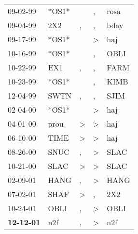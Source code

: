 \begin{supertabular}{p{0.07\textwidth}p{0.06\textwidth}p{0.02\textwidth}p{0.02\textwidth}p{0.06\textwidth}}
          09-02-99\textsuperscript{} &                   *OS1* &               &             , &  rosa\textsuperscript{} \\
          09-04-99\textsuperscript{} &   2X2\textsuperscript{} &             , &             , &  bday\textsuperscript{} \\
          09-17-99\textsuperscript{} &                   *OS1* &               &  \textgreater &   haj\textsuperscript{} \\
          10-16-99\textsuperscript{} &                   *OS1* &               &             , &  OBLI\textsuperscript{} \\
          10-22-99\textsuperscript{} &   EX1\textsuperscript{} &             , &             , &  FARM\textsuperscript{} \\
          10-23-99\textsuperscript{} &                   *OS1* &               &             , &  KIMB\textsuperscript{} \\
          12-04-99\textsuperscript{} &  SWTN\textsuperscript{} &             , &             , &  SJIM\textsuperscript{} \\
          02-04-00\textsuperscript{} &                   *OS1* &               &  \textgreater &   haj\textsuperscript{} \\
          04-01-00\textsuperscript{} &  prou\textsuperscript{} &  \textgreater &  \textgreater &   haj\textsuperscript{} \\
          06-10-00\textsuperscript{} &  TIME\textsuperscript{} &  \textgreater &  \textgreater &   haj\textsuperscript{} \\
          08-26-00\textsuperscript{} &  SNUC\textsuperscript{} &             , &  \textgreater &  SLAC\textsuperscript{} \\
          10-21-00\textsuperscript{} &  SLAC\textsuperscript{} &  \textgreater &  \textgreater &  SLAC\textsuperscript{} \\
          02-09-01\textsuperscript{} &  HANG\textsuperscript{} &             , &  \textgreater &  HANG\textsuperscript{} \\
          07-02-01\textsuperscript{} &  SHAF\textsuperscript{} &  \textgreater &             , &   2X2\textsuperscript{} \\
          10-24-01\textsuperscript{} &  OBLI\textsuperscript{} &             , &  \textgreater &  OBLI\textsuperscript{} \\
 \textbf{12-12-01\textsuperscript{}} &   n2f\textsuperscript{} &             , &  \textgreater &   n2f\textsuperscript{} \\
\end{supertabular}
